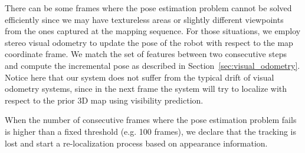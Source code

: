 There can be some frames where the pose estimation problem cannot be
solved efficiently since we may have textureless areas or slightly
different viewpoints from the ones captured at the mapping
sequence. For those situations, we employ stereo visual odometry to
update the pose of the robot with respect to the map coordinate
frame. We match the set of features between two consecutive steps and
compute the incremental pose as described in
Section~\ref{sec:visual_odometry}. Notice here that our system does
not suffer from the typical drift of visual odometry systems, since in
the next frame the system will try to localize with respect to the
prior 3D map using visibility prediction.

When the number of consecutive frames where the pose estimation
problem fails is higher than a fixed threshold (e.g. 100 frames), we
declare that the tracking is lost and start a re-localization process
based on appearance information.
